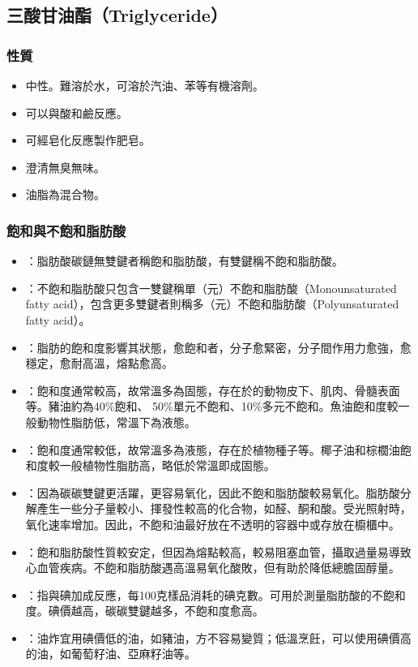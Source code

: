 \documentclass[a4paper,12pt]{report}
\begin{document}
\begin{itemize}
\begin{itemize}
\subsection{三酸甘油酯（Triglyceride）}
\subsubsection{性質}
\begin{itemize}
\item 中性。難溶於水，可溶於汽油、苯等有機溶劑。
\item 可以與酸和鹼反應。
\item 可經皂化反應製作肥皂。
\item 澄清無臭無味。
\item 油脂為混合物。
\end{itemize}
\subsubsection{飽和與不飽和脂肪酸}
\begin{itemize}
\item {}：脂肪酸碳鏈無雙鍵者稱飽和脂肪酸，有雙鍵稱不飽和脂肪酸。
\item {}：不飽和脂肪酸只包含一雙鍵稱單（元）不飽和脂肪酸（Monounsaturated fatty acid），包含更多雙鍵者則稱多（元）不飽和脂肪酸（Polyunsaturated fatty acid）。
\item {}：脂肪的飽和度影響其狀態，愈飽和者，分子愈緊密，分子間作用力愈強，愈穩定，愈耐高溫，熔點愈高。
\item {}：飽和度通常較高，故常溫多為固態，存在於的動物皮下、肌肉、骨髓表面等。豬油約為40\%飽和、 50\%單元不飽和、10\%多元不飽和。魚油飽和度較一般動物性脂肪低，常溫下為液態。
\item {}：飽和度通常較低，故常溫多為液態，存在於植物種子等。椰子油和棕櫚油飽和度較一般植物性脂肪高，略低於常溫即成固態。
\item {}：因為碳碳雙鍵更活躍，更容易氧化，因此不飽和脂肪酸較易氧化。脂肪酸分解產生一些分子量較小、揮發性較高的化合物，如醛、酮和酸。受光照射時，氧化速率增加。因此，不飽和油最好放在不透明的容器中或存放在櫥櫃中。
\item {}：飽和脂肪酸性質較安定，但因為熔點較高，較易阻塞血管，攝取過量易導致心血管疾病。不飽和脂肪酸遇高溫易氧化酸敗，但有助於降低總膽固醇量。
\item {}：指與碘加成反應，每100克樣品消耗的碘克數。可用於測量脂肪酸的不飽和度。碘價越高，碳碳雙鍵越多，不飽和度愈高。
\item {}：油炸宜用碘價低的油，如豬油，方不容易變質；低溫烹飪，可以使用碘價高的油，如葡萄籽油、亞麻籽油等。

\end{itemize}
\end{itemize}
\end{itemize}
\end{document}
